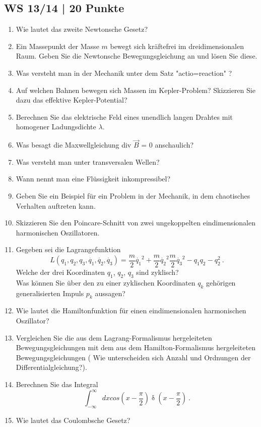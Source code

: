 \subsection{WS 13/14 | 20 Punkte}
\begin{enumerate}
    \item Wie lautet das zweite Newtonsche Gesetz?
    \item Ein Massepunkt der Masse $m$ bewegt sich kräftefrei im dreidimensionalen Raum. Geben Sie die Newtonsche Bewegungsgleichung an und lösen Sie diese.
    \item Was versteht man in der Mechanik unter dem Satz  "actio=reaction" ? 
    \item Auf welchen Bahnen bewegen sich Massen im Kepler-Problem? Skizzieren Sie dazu das effektive Kepler-Potential?
    \item Berechnen Sie das elektrische Feld eines unendlich langen Drahtes mit homogener Ladungsdichte $\lambda$.
    \item Was besagt die Maxwellgleichung div $\vec{B}$ = 0 anschaulich?
    \item Was versteht man unter transversalen Wellen?
    \item Wann nennt man eine Flüssigkeit inkompressibel?
    \item Geben Sie ein Beispiel für ein Problem in der Mechanik, in dem chaotisches Verhalten auftreten kann.
    \item Skizzieren Sie den Poincare-Schnitt von zwei ungekoppelten eindimensionalen harmonischen Oszillatoren.
    \item Gegeben sei die Lagrangefunktion
    \begin{equation*}
        L (q_1, q_2, q_3, \dot{q_1}, \dot{q_2}, \dot{q_3}) = \frac{m}{2} \dot{q_1}^2 +  \frac{m}{2} \dot{q_2}^2 \frac{m}{2} \dot{q_3}^2 - q_1 q_2 - q_2^2 \medspace .
    \end{equation*}
            Welche der drei Koordinaten $q_1$, $q_2$, $q_3$ sind zyklisch?\\
            Was können Sie über den zu einer zyklischen Koordinaten $q_k$ gehörigen generalisierten Impuls $p_k$ aussagen?
    \item Wie lautet die Hamiltonfunktion für einen eindimensionalen harmonischen Oszillator?
    \item Vergleichen Sie die aus dem Lagrang-Formalismus hergeleiteten Bewegungsgleichungen mit dem aus dem Hamilton-Formalismus hergeleiteten Bewegungsgleichungen ( Wie unterscheiden sich Anzahl und Ordnungen der Differentialgleichung?).
    \item Berechnen Sie das Integral
    \begin{equation*}
        \int_{-\infty}^{\infty} dx cos(x - \frac{\pi}{2}) \updelta (x - \frac{\pi}{2}) \medspace . 
    \end{equation*}
    \item Wie lautet das Coulombsche Gesetz?
\end{enumerate}
